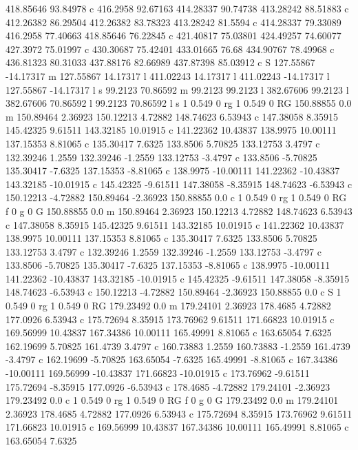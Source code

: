418.85646 93.84978 c 
416.2958 92.67163 
414.28337 90.74738 
413.28242 88.51883 c 
412.26382 86.29504 
412.26382 83.78323 
413.28242 81.5594 c 
414.28337 79.33089 
416.2958 77.40663 
418.85646 76.22845 c 
421.40817 75.03801 
424.49257 74.60077 
427.3972 75.01997 c 
430.30687 75.42401 
433.01665 76.68 
434.90767 78.49968 c 
436.81323 80.31033 
437.88176 82.66989 
437.87398 85.03912 c 
S 
127.55867 -14.17317 m 
127.55867 14.17317 l 
411.02243 14.17317 l 
411.02243 -14.17317 l 
127.55867 -14.17317 l 
s 
99.2123 70.86592 m 
99.2123 99.2123 l 
382.67606 99.2123 l 
382.67606 70.86592 l 
99.2123 70.86592 l 
s 
1 0.549 0 rg 1 0.549 0 RG 
150.88855 0.0 m 
150.89464 2.36923 
150.12213 4.72882 
148.74623 6.53943 c 
147.38058 8.35915 
145.42325 9.61511 
143.32185 10.01915 c 
141.22362 10.43837 
138.9975 10.00111 
137.15353 8.81065 c 
135.30417 7.6325 
133.8506 5.70825 
133.12753 3.4797 c 
132.39246 1.2559 
132.39246 -1.2559 
133.12753 -3.4797 c 
133.8506 -5.70825 
135.30417 -7.6325 
137.15353 -8.81065 c 
138.9975 -10.00111 
141.22362 -10.43837 
143.32185 -10.01915 c 
145.42325 -9.61511 
147.38058 -8.35915 
148.74623 -6.53943 c 
150.12213 -4.72882 
150.89464 -2.36923 
150.88855 0.0 c 
1 0.549 0 rg 1 0.549 0 RG f 
0 g 0 G 
150.88855 0.0 m 
150.89464 2.36923 
150.12213 4.72882 
148.74623 6.53943 c 
147.38058 8.35915 
145.42325 9.61511 
143.32185 10.01915 c 
141.22362 10.43837 
138.9975 10.00111 
137.15353 8.81065 c 
135.30417 7.6325 
133.8506 5.70825 
133.12753 3.4797 c 
132.39246 1.2559 
132.39246 -1.2559 
133.12753 -3.4797 c 
133.8506 -5.70825 
135.30417 -7.6325 
137.15353 -8.81065 c 
138.9975 -10.00111 
141.22362 -10.43837 
143.32185 -10.01915 c 
145.42325 -9.61511 
147.38058 -8.35915 
148.74623 -6.53943 c 
150.12213 -4.72882 
150.89464 -2.36923 
150.88855 0.0 c 
S 
1 0.549 0 rg 1 0.549 0 RG 
179.23492 0.0 m 
179.24101 2.36923 
178.4685 4.72882 
177.0926 6.53943 c 
175.72694 8.35915 
173.76962 9.61511 
171.66823 10.01915 c 
169.56999 10.43837 
167.34386 10.00111 
165.49991 8.81065 c 
163.65054 7.6325 
162.19699 5.70825 
161.4739 3.4797 c 
160.73883 1.2559 
160.73883 -1.2559 
161.4739 -3.4797 c 
162.19699 -5.70825 
163.65054 -7.6325 
165.49991 -8.81065 c 
167.34386 -10.00111 
169.56999 -10.43837 
171.66823 -10.01915 c 
173.76962 -9.61511 
175.72694 -8.35915 
177.0926 -6.53943 c 
178.4685 -4.72882 
179.24101 -2.36923 
179.23492 0.0 c 
1 0.549 0 rg 1 0.549 0 RG f 
0 g 0 G 
179.23492 0.0 m 
179.24101 2.36923 
178.4685 4.72882 
177.0926 6.53943 c 
175.72694 8.35915 
173.76962 9.61511 
171.66823 10.01915 c 
169.56999 10.43837 
167.34386 10.00111 
165.49991 8.81065 c 
163.65054 7.6325 
